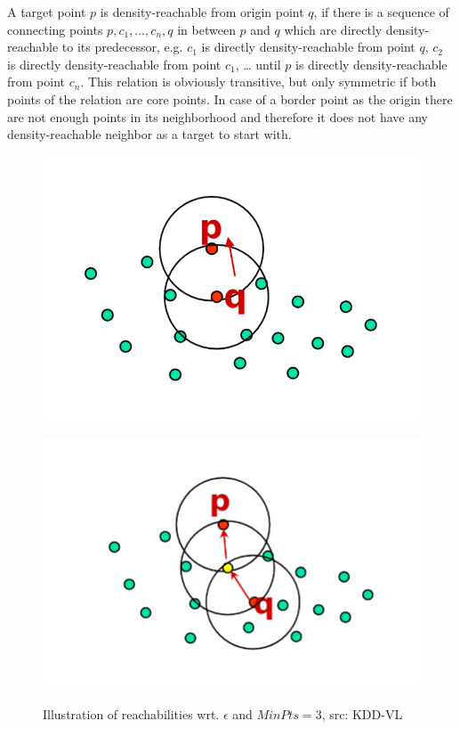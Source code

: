 A target point $p$ is density-reachable from origin point $q$, if there is a sequence of connecting points $p, c_1, \dotsc, c_n, q$ in between $p$ and $q$ which are directly density-reachable to its predecessor, e.g. $c_1$ is directly density-reachable from point $q$, $c_2$ is directly density-reachable from point $c_1$, \dots{} until $p$ is directly density-reachable from point $c_n$. This relation is obviously transitive, but only symmetric if both points of the relation are core points. In case of a border point as the origin there are not enough points in its neighborhood and therefore it does not have any density-reachable neighbor as a target to start with.

\begin{figure}
    \centering
    \begin{minipage}[t]{.5\textwidth}
      \centering  
      \captionsetup{width=.9\linewidth}
      \includegraphics[width=.8\textwidth]{figures/directlydensityreachable.png}
      \label{fig:test1}
    \end{minipage}%
    \begin{minipage}[t]{.5\textwidth}
      \centering
      \captionsetup{width=.9\linewidth}
      \includegraphics[width=.8\textwidth]{figures/density-reachable.png}
      \label{fig:test2}
    \end{minipage}
    \caption{Illustration of reachabilities wrt. $\epsilon$ and $MinPts = 3$, src: KDD-VL}
\end{figure}

